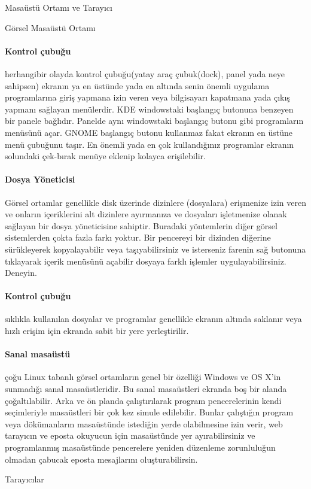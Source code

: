 \begin{section}{Masaüstü Ortamı ve Tarayıcı}
\begin{subsection}{Görsel Masaüstü Ortamı}
\paragraph{Kontrol çubuğu}{ herhangibir olayda kontrol çubuğu(yatay araç çubuk(dock), panel yada neye sahipsen) ekranın ya en üstünde yada en altında senin önemli uygulama programlarına giriş yapmana izin veren veya bilgisayarı kapatmana yada çıkış yapmanı sağlayan menülerdir. KDE windowstaki başlangıç butonuna benzeyen bir panele bağlıdır. Panelde aynı windowstaki başlangıç butonu gibi programların menüsünü açar. GNOME başlangıç butonu kullanmaz fakat ekranın en üstüne menü çubuğunu taşır. En önemli yada en çok kullandığınız programlar ekranın solundaki çek-bırak menüye eklenip kolayca erişilebilir.}
\paragraph{Dosya Yöneticisi}{ Görsel ortamlar genellikle disk üzerinde dizinlere (dosyalara) erişmenize izin veren ve onların içeriklerini alt dizinlere ayırmanıza ve dosyaları işletmenize olanak sağlayan bir dosya yöneticisine sahiptir. Buradaki yöntemlerin diğer görsel sistemlerden çokta fazla farkı yoktur. Bir pencereyi bir dizinden diğerine sürükleyerek kopyalayabilir veya taşıyabilirsiniz ve isterseniz farenin sağ butonuna tıklayarak içerik menüsünü açabilir dosyaya farklı işlemler uygulayabilirsiniz. Deneyin.}
\paragraph{Kontrol çubuğu}{ sıklıkla kullanılan dosyalar ve programlar genellikle ekranın altında saklanır veya hızlı erişim için ekranda sabit bir yere yerleştirilir. }
\paragraph{Sanal masaüstü}{ çoğu Linux tabanlı görsel ortamların genel bir özelliği Windows ve OS X’in sunmadığı sanal masaüstleridir. Bu sanal masaüstleri ekranda boş bir alanda çoğaltılabilir. Arka ve ön planda çalıştırılarak program pencerelerinin kendi seçimleriyle masaüstleri bir çok kez simule edilebilir. Bunlar çalıştığın program veya dökümanların masaüstünde istediğin yerde olabilmesine izin verir, web tarayıcın ve eposta okuyucun için masaüstünde yer ayırabilirsiniz ve programlanmış masaüstünde pencerelere yeniden düzenleme zorunluluğun olmadan çabucak eposta mesajlarını  oluşturabilirsin.}
\end{subsection}
\begin{subsection}{Tarayıcılar}


\end{subsection}
\end{section}
